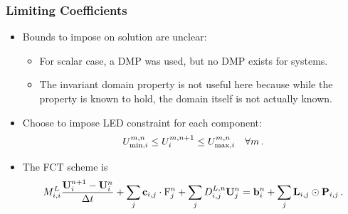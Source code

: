\documentclass{beamer} \useoutertheme{infolines}
\begin{document}
\begin{frame}
\frametitle{Limiting Coefficients}

\begin{itemize}
  \item Bounds to impose on solution are unclear:
    \begin{itemize}
      \item For scalar case, a DMP was used, but no DMP exists for systems.
      \item The invariant domain property is not useful here
        because while the property is known to hold, the domain itself is not
        actually known.
    \end{itemize}
  \item Choose to impose LED constraint for each component:
    \begin{equation}
      U_{\min,i}^{m,n}
        \leq U_i^{m,n+1}
        \leq U_{\max,i}^{m,n}
      \quad \forall m \,.
    \end{equation}
  \item The FCT scheme is
    \begin{equation}
      \lumpedmassentry
        \frac{\solutionvector_i^{n+1}-\solutionvector_i^n}{\dt}
        + \sum_j\gradiententry\cdot\consfluxinterpolant_j^n
        + \sum_j\diffusionmatrixletter\ij^{L,n}\solutionvector_j^n
        = \ssrhs_i^n + \sum_j\limitermatrix\ij\odot\correctionfluxmatrix\ij \eqp
    \end{equation}
\end{itemize}

\end{frame}
\end{document}
